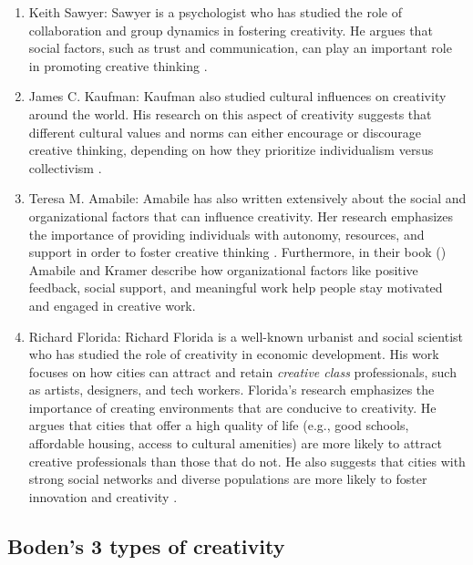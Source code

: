 \begin{enumerate}

\item Keith Sawyer: Sawyer is a psychologist who has studied the role of collaboration and group dynamics in fostering creativity. He argues that social factors, such as trust and communication, can play an important role in promoting creative thinking \citep{Sawyer2017}.

\item James C. Kaufman: Kaufman also studied cultural influences on creativity around the world. His research on this aspect of creativity suggests that different cultural values and norms can either encourage or discourage creative thinking, depending on how they prioritize individualism versus collectivism \citep{Kaufman2019}.

\item Teresa M. Amabile: Amabile has also written extensively about  the social and organizational factors that can influence creativity. Her research emphasizes the importance of providing individuals with autonomy, resources, and support in order to foster creative thinking \citep{Amabile1996}. Furthermore, in their book  (\citeyear{Amabile2014}) Amabile and Kramer describe how organizational factors like positive feedback, social support, and meaningful work help people stay motivated and engaged in creative work.

\item Richard Florida: Richard Florida is a well-known urbanist and social scientist who has studied the role of creativity in economic development. His work focuses on how cities can attract and retain \emph{creative class} professionals, such as artists, designers, and tech workers. Florida's research emphasizes the importance of creating environments that are conducive to creativity. He argues that cities that offer a high quality of life (e.g., good schools, affordable housing, access to cultural amenities) are more likely to attract creative professionals than those that do not. He also suggests that cities with strong social networks and diverse populations are more likely to foster innovation and creativity \citep{Florida2014}.
\end{enumerate}

\subsection{Boden's 3 types of creativity}


